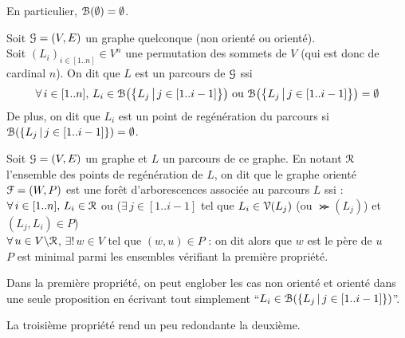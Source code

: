 		\begin{Remarque}
			En particulier, \(\EuScript{B}(\emptyset) = \emptyset\).
		\end{Remarque}
	
		\begin{Definition}
			Soit \(\EuScript{G} = (V,E)\) un graphe quelconque (non orienté ou orienté). \\
			Soit \((L_i)_{i\in[1..n]} \in V^n\) une permutation des sommets de \(V\) (qui est donc de cardinal \(n\)). \nt
			On dit que \(L\) est un parcours de \(\EuScript{G}\) ssi
				\[
					\forall\,i\in[1..n],\, L_i\in \EuScript{B}\big(\!\left\{L_j\,\middle|\, j\in [1..i-1]\right\}\!\big) \text{ ou } \EuScript{B}\big(\!\left\{L_j\,\middle|\, j\in [1..i-1]\right\}\!\big) = \emptyset
				\]
			De plus, on dit que \(L_i\) est un point de regénération du parcours si \(\EuScript{B}(\{L_j\,|\, j\in [1..i-1]\}) = \emptyset\).
		\end{Definition}
	
		\begin{Definition}
			Soit \(\EuScript{G} = (V,E)\) un graphe et \(L\) un parcours de ce graphe. En notant \(\EuScript{R}\) l'ensemble des points de regénération de \(L\), on dit que le graphe orienté \(\EuScript{F} = (W,P)\) est une forêt d'arborescences associée au parcours \(L\) ssi : \\
			 \bdot \(\forall\,i\in[1..n],\, L_i\in\EuScript{R}\) ou (\(\exists\,j\in[1..i-1]\) tel que \(L_i\in \EuScript{V}(L_j)\) (ou \(\Succ(L_j)\)) et \((L_j,L_i) \in P\)) \\
			 \bdot \(\forall\, u\in V\backslash \EuScript{R}\), \(\exists!\, w\in V\) tel que \((w,u)\in P\) : on dit alors que \(w\) est le père de \(u\) \\
			 \bdot \(P\) est minimal parmi les ensembles vérifiant la première propriété.
		\end{Definition}
		
		\begin{Remarque}
			Dans la première propriété, on peut englober les cas non orienté et orienté dans une seule proposition en écrivant tout simplement ``\(L_i \in \EuScript{B}(\{L_j\,|\, j\in [1..i-1]\})\)''.
		\end{Remarque}
		\begin{Remarque}
			La troisième propriété rend un peu redondante la deuxième.
		\end{Remarque}
		
